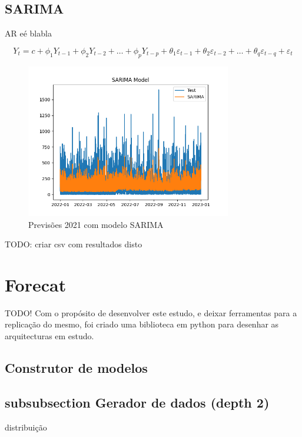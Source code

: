 \subsection{SARIMA}

AR eé blabla

\begin{equation} \label{eq:SARIMA} Y_t = c + \phi_1 Y_{t-1} + \phi_2 Y_{t-2} + \dots + \phi_p Y_{t-p} + \theta_1 \varepsilon_{t-1} + \theta_2 \varepsilon_{t-2} + \dots + \theta_q \varepsilon_{t-q} + \varepsilon_t \end{equation}

\begin{figure}[H]
    \centering
    \includegraphics[width=0.8\textwidth]{../plots/SARIMA_model.png}
    \caption{Previsões 2021 com modelo SARIMA}
    \label{fig:SARIMA_model}
\end{figure}


TODO: criar csv com resultados disto

\section{Forecat  \label{se:forecat}}

TODO!
Com o propósito de desenvolver este estudo, e deixar ferramentas para a replicação do mesmo, foi criado uma biblioteca em python para desenhar as arquitecturas em estudo.


\subsection{Construtor de modelos}


\subsection{subsubsection Gerador de dados (depth 2)}
distribuição

